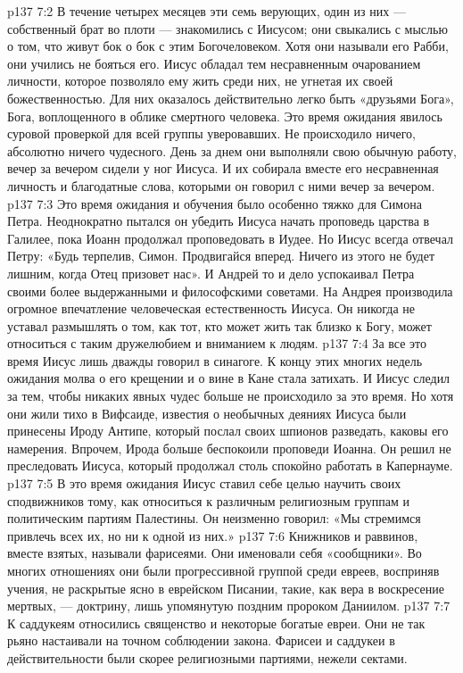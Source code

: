 \vs p137 7:2 В течение четырех месяцев эти семь верующих, один из них --- собственный брат во плоти --- знакомились с Иисусом; они свыкались с мыслью о том, что живут бок о бок с этим Богочеловеком. Хотя они называли его Рабби, они учились не бояться его. Иисус обладал тем несравненным очарованием личности, которое позволяло ему жить среди них, не угнетая их своей божественностью. Для них оказалось действительно легко быть «друзьями Бога», Бога, воплощенного в облике смертного человека. Это время ожидания явилось суровой проверкой для всей группы уверовавших. Не происходило ничего, абсолютно ничего чудесного. День за днем они выполняли свою обычную работу, вечер за вечером сидели у ног Иисуса. И их собирала вместе его несравненная личность и благодатные слова, которыми он говорил с ними вечер за вечером.
\vs p137 7:3 Это время ожидания и обучения было особенно тяжко для Симона Петра. Неоднократно пытался он убедить Иисуса начать проповедь царства в Галилее, пока Иоанн продолжал проповедовать в Иудее. Но Иисус всегда отвечал Петру: «Будь терпелив, Симон. Продвигайся вперед. Ничего из этого не будет лишним, когда Отец призовет нас». И Андрей то и дело успокаивал Петра своими более выдержанными и философскими советами. На Андрея производила огромное впечатление человеческая естественность Иисуса. Он никогда не уставал размышлять о том, как тот, кто может жить так близко к Богу, может относиться с таким дружелюбием и вниманием к людям.
\vs p137 7:4 За все это время Иисус лишь дважды говорил в синагоге. К концу этих многих недель ожидания молва о его крещении и о вине в Кане стала затихать. И Иисус следил за тем, чтобы никаких явных чудес больше не происходило за это время. Но хотя они жили тихо в Вифсаиде, известия о необычных деяниях Иисуса были принесены Ироду Антипе, который послал своих шпионов разведать, каковы его намерения. Впрочем, Ирода больше беспокоили проповеди Иоанна. Он решил не преследовать Иисуса, который продолжал столь спокойно работать в Капернауме.
\vs p137 7:5 В это время ожидания Иисус ставил себе целью научить своих сподвижников тому, как относиться к различным религиозным группам и политическим партиям Палестины. Он неизменно говорил: «Мы стремимся привлечь всех их, но  ни к одной из них.»
\vs p137 7:6 \pc Книжников и раввинов, вместе взятых, называли фарисеями. Они именовали себя «сообщники». Во многих отношениях они были прогрессивной группой среди евреев, восприняв учения, не раскрытые ясно в еврейском Писании, такие, как вера в воскресение мертвых, --- доктрину, лишь упомянутую поздним пророком Даниилом.
\vs p137 7:7 \pc К саддукеям относились священство и некоторые богатые евреи. Они не так рьяно настаивали на точном соблюдении закона. Фарисеи и саддукеи в действительности были скорее религиозными партиями, нежели сектами.
